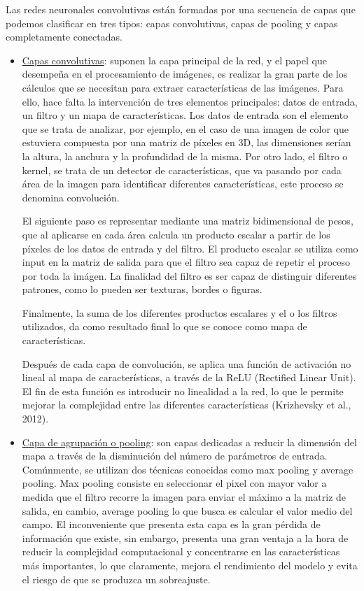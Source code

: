 Las redes neuronales convolutivas están formadas por una secuencia de capas que podemos clasificar en tres tipos: capas convolutivas, capas de pooling y capas completamente conectadas.\\ 
\begin{itemize}
	\item \underline{Capas convolutivas}: suponen la capa principal de la red, y el papel que desempeña en el procesamiento de imágenes, es realizar la gran parte de los cálculos que se necesitan para extraer características de las imágenes. Para ello, hace falta la intervención de tres elementos principales: datos de entrada, un filtro y un mapa de características. 
	Los datos de entrada son el elemento que se trata de analizar, por ejemplo, en el caso de una imagen de color que estuviera compuesta por una matriz de píxeles en 3D, las dimensiones serían la altura, la anchura y la profundidad de la misma. 
	Por otro lado, el filtro o kernel, se trata de un detector de características, que va pasando por cada área de la imagen para identificar diferentes características, este proceso se denomina convolución. 

	El siguiente paso es representar mediante una matriz bidimensional de pesos, que al aplicarse en cada área calcula un producto escalar a partir de los píxeles de los datos de entrada y del filtro. El producto escalar se utiliza como input en la matriz de salida para que el filtro sea capaz de repetir el proceso por toda la imágen. La finalidad del filtro es ser capaz de distinguir diferentes patrones, como lo pueden ser texturas, bordes o figuras. 
	
	Finalmente, la suma de los diferentes productos escalares y el o los filtros utilizados, da como resultado final lo que se conoce como mapa de características. 
	
	Después de cada capa de convolución, se aplica una función de activación no lineal al mapa de características, a través de la ReLU (Rectified Linear Unit). El fin de esta función es introducir no linealidad a la red, lo que le permite mejorar la complejidad entre las diferentes características (Krizhevsky et al., 2012). \\
	
\item	\underline{Capa de agrupación o pooling}: son capas dedicadas a reducir la dimensión del mapa a través de la disminución del número de parámetros de entrada.
	Comúnmente, se utilizan dos técnicas conocidas como max pooling y average pooling. Max pooling consiste en seleccionar el pixel con mayor valor a medida que el filtro recorre la imagen para enviar el máximo a la matriz de salida, en cambio, average pooling lo que busca es calcular el valor medio del campo. El inconveniente que presenta esta capa es la gran pérdida de información que existe, sin embargo, presenta una gran ventaja a la hora de reducir la complejidad computacional y concentrarse en las características más importantes, lo que claramente, mejora el rendimiento del modelo y evita el riesgo de que se produzca un sobreajuste.\\
	

\end{itemize}
